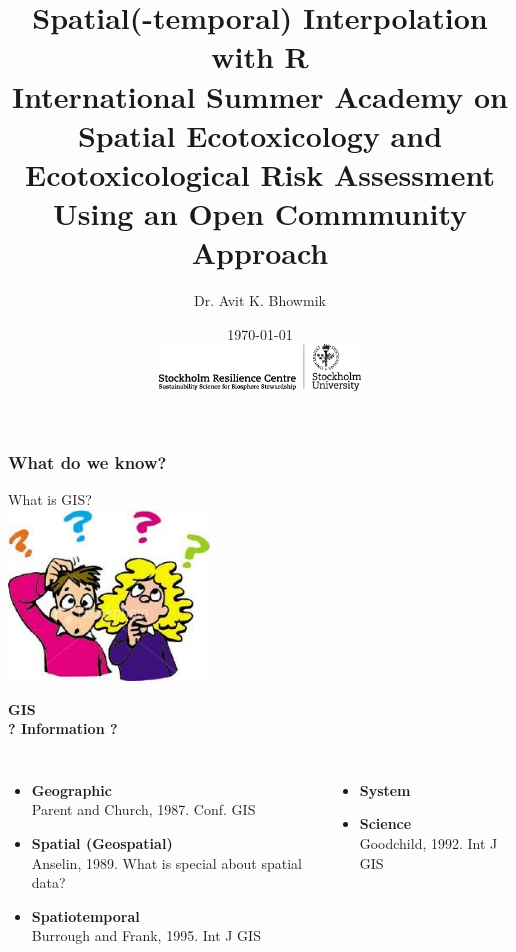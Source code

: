 \documentclass{beamer}
\title[Spatial Interpolation. Summer Academy `17]{Spatial(-temporal) Interpolation with R\\
\medskip \tiny{International Summer Academy on Spatial Ecotoxicology and Ecotoxicological Risk Assessment\\Using an Open Commmunity Approach}} %
\author[Avit Bhowmik]{Dr. Avit K. Bhowmik \\} %
\institute[SRC] %
{
\textit{avit.bhowmik@su.se}%
}
\date[\today]{\today \\[0.5cm]
\includegraphics[width=0.4\textwidth]{Figures/SRC_logo.png}} %
\begin{document}
\begin{frame}
\titlepage %
\end{frame}


\begin{frame}
\frametitle{What do we know?}
\centering
\Huge \alert{What is GIS?}\\
\vspace{1cm}
\includegraphics[width=0.4\textwidth]{Figures/Questions.png}
\end{frame}


\begin{frame}
\centering
\Huge \alert{\textbf{GIS}}\\
\pause
\Large \textbf{? Information ?}
\pause
\medskip
\normalsize
\begin{columns}[t]
\begin{itemize}
\item \alert{\textbf{Geographic}}\\
Parent and Church, 1987. Conf. GIS
\item \alert {\textbf {Spatial (Geospatial)}}\\
Anselin, 1989. What is special about spatial data?
\item \alert{\textbf{Spatiotemporal}}\\
Burrough and Frank, 1995. Int J GIS
\end{itemize}
\hspace{2cm}
\pause
{}
\begin{itemize}
\item \alert{\textbf{System}}
\item \alert{\textbf{Science}}\\
Goodchild, 1992. Int J GIS
\end{itemize}
\end{columns}
\end{frame}
\end{document}
